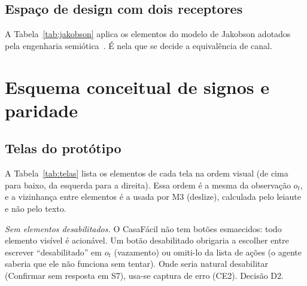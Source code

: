 \documentclass[conference,onecolumn]{IEEEtran}
\begin{document}
\subsection{Espaço de design com dois receptores}
A Tabela~\ref{tab:jakobson} aplica os elementos do modelo de Jakobson adotados pela engenharia semiótica~\cite{barbosa2010}. É nela que se decide a equivalência de canal.

\begin{table}[!h]
\caption{Espaço de design com dois receptores}
\label{tab:jakobson}
\centering
\scriptsize

\end{table}

\section{Esquema conceitual de signos e paridade}\label{sec:signos}

\subsection{Telas do protótipo}
A Tabela~\ref{tab:telas} lista os elementos de cada tela na ordem visual (de cima para baixo, da esquerda para a direita). Essa ordem é a mesma da observação $o_t$, e a vizinhança entre elementos é a usada por M3 (deslize), calculada pelo leiaute e não pelo texto.

\begin{table}[!h]
\caption{Inventário de telas (ordem visual = ordem em $o_t$; \textit{[B]}: só na versão B)}
\label{tab:telas}
\centering
\scriptsize

\end{table}

\textit{Sem elementos desabilitados.} O CasaFácil não tem botões esmaecidos: todo elemento visível é acionável. Um botão desabilitado obrigaria a escolher entre escrever ``desabilitado'' em $o_t$ (vazamento) ou omiti-lo da lista de ações (o agente saberia que ele não funciona sem tentar). Onde seria natural desabilitar (Confirmar sem resposta em S7), usa-se captura de erro (CE2). Decisão D2.
\end{document}
